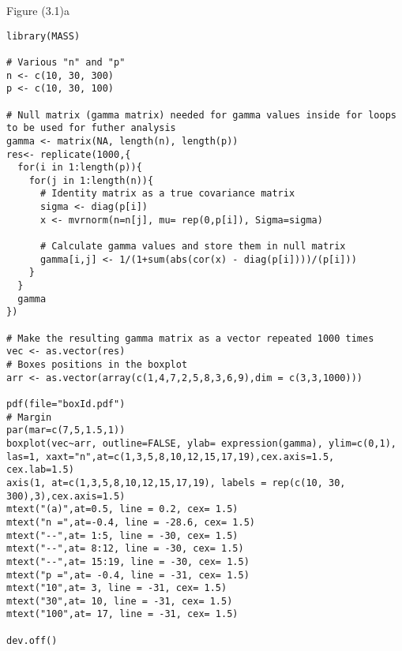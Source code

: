 Figure (3.1)a
\begin{lstlisting}
library(MASS)

# Various "n" and "p"
n <- c(10, 30, 300)
p <- c(10, 30, 100)

# Null matrix (gamma matrix) needed for gamma values inside for loops to be used for futher analysis
gamma <- matrix(NA, length(n), length(p))
res<- replicate(1000,{
  for(i in 1:length(p)){
    for(j in 1:length(n)){
      # Identity matrix as a true covariance matrix
      sigma <- diag(p[i])
      x <- mvrnorm(n=n[j], mu= rep(0,p[i]), Sigma=sigma)
      
      # Calculate gamma values and store them in null matrix
      gamma[i,j] <- 1/(1+sum(abs(cor(x) - diag(p[i])))/(p[i]))
    }
  }
  gamma
})

# Make the resulting gamma matrix as a vector repeated 1000 times 
vec <- as.vector(res)
# Boxes positions in the boxplot
arr <- as.vector(array(c(1,4,7,2,5,8,3,6,9),dim = c(3,3,1000)))

pdf(file="boxId.pdf")
# Margin
par(mar=c(7,5,1.5,1))
boxplot(vec~arr, outline=FALSE, ylab= expression(gamma), ylim=c(0,1), las=1, xaxt="n",at=c(1,3,5,8,10,12,15,17,19),cex.axis=1.5, cex.lab=1.5)
axis(1, at=c(1,3,5,8,10,12,15,17,19), labels = rep(c(10, 30, 300),3),cex.axis=1.5)
mtext("(a)",at=0.5, line = 0.2, cex= 1.5)
mtext("n =",at=-0.4, line = -28.6, cex= 1.5)
mtext("--",at= 1:5, line = -30, cex= 1.5)
mtext("--",at= 8:12, line = -30, cex= 1.5)
mtext("--",at= 15:19, line = -30, cex= 1.5)
mtext("p =",at= -0.4, line = -31, cex= 1.5)
mtext("10",at= 3, line = -31, cex= 1.5)
mtext("30",at= 10, line = -31, cex= 1.5)
mtext("100",at= 17, line = -31, cex= 1.5)

dev.off()
\end{lstlisting}

